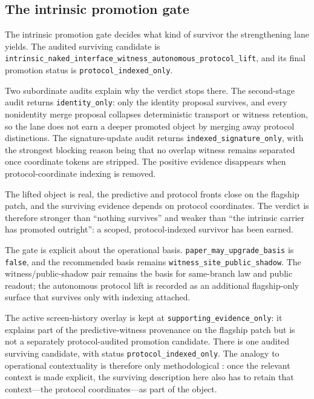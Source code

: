 \documentclass[11pt]{article}
\theoremstyle{definition}
\begin{document}
\subsection{The intrinsic promotion gate}

The intrinsic promotion gate decides what kind of survivor the strengthening lane
yields. The audited surviving candidate is
\nolinkurl{intrinsic_naked_interface_witness_autonomous_protocol_lift}, and its final
promotion status is \texttt{protocol\_indexed\_only}.

Two subordinate audits explain why the verdict stops there. The second-stage audit
returns \texttt{identity\_only}: only the identity proposal survives, and every
nonidentity merge proposal collapses deterministic transport or witness retention, so
the lane does not earn a deeper promoted object by merging away protocol distinctions.
The signature-update audit returns \texttt{indexed\_signature\_only}, with the
strongest blocking reason being that no overlap witness remains separated once
coordinate tokens are stripped. The positive evidence disappears when protocol-coordinate
indexing is removed.

The lifted object is real, the predictive and protocol fronts close on the flagship
patch, and the surviving evidence depends on protocol coordinates. The verdict is
therefore stronger than ``nothing survives'' and weaker than ``the intrinsic carrier has
promoted outright'': a scoped, protocol-indexed survivor has been earned.

The gate is explicit about the operational basis. \texttt{paper\_may\_upgrade\_basis}
is \texttt{false}, and the recommended basis remains
\texttt{witness\_site\_public\_shadow}. The witness/public-shadow pair remains the
basis for same-branch law and public readout; the autonomous protocol lift is recorded
as an additional flagship-only surface that survives only with indexing attached.

The active screen-history overlay is kept at \texttt{supporting\_evidence\_only}: it
explains part of the predictive-witness provenance on the flagship patch but is not a
separately protocol-audited promotion candidate. There is one audited surviving
candidate, with status \texttt{protocol\_indexed\_only}. The analogy to operational
contextuality is therefore only methodological \citep{Spekkens2005}: once the
relevant context is made explicit, the surviving description here also has to retain
that context---the protocol coordinates---as part of the object.
\end{document}
